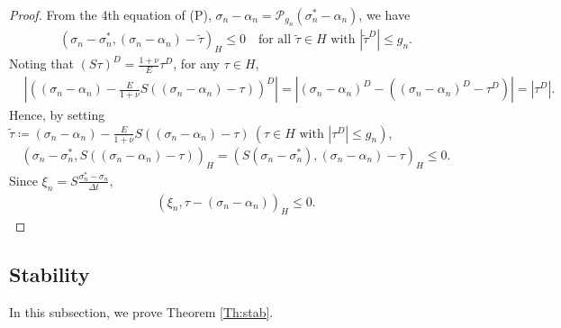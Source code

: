 \documentclass[11pt, a4paper]{article}
\newcommand{\defeq}{\coloneqq}
\newcommand{\dt}{{\Delta t}}
\newcommand{\Hs}{{H}}
\newcommand{\Pop}[1]{\mathcal{P}_{#1}}
\newcommand{\sigmas}[1]{{\sigma_{#1}^*}}
\begin{document}
\begin{proof}
From the 4th equation of (P), $\sigma_n - \alpha_n = \Pop{g_n}(\sigmas{n} - \alpha_n )$, we have 
\begin{align*}
    \left(\sigma_n - \sigmas{n},
    (\sigma_n - \alpha_n) - \tilde{\tau} \right)_\Hs \le 0
    \quad\mbox{for all }\tilde{\tau}\in\Hs\mbox{ with }|\tilde{\tau}^D| \le g_n.
\end{align*}
Noting that $(S\tau)^D = \frac{1+\nu}{E}\tau^D$, for any $\tau\in\Hs$,
\begin{align*}
    &\left|\left((\sigma_n - \alpha_n) - \frac{E}{1+\nu}S\left((\sigma_n - \alpha_n) - \tau\right)\right)^D\right|
    = \left|(\sigma_n - \alpha_n)^D - \left((\sigma_n - \alpha_n)^D - \tau^D\right)\right|
    = |\tau^D|.
\end{align*}
Hence, by setting $\tilde{\tau} \defeq (\sigma_n - \alpha_n) - \frac{E}{1+\nu}S\left((\sigma_n - \alpha_n) - \tau\right)~(\tau\in\Hs\mbox{ with }|\tau^D| \le g_n)$, 
\begin{align*}
    \left(\sigma_n - \sigmas{n},
    S\left((\sigma_n - \alpha_n) - \tau\right) \right)_\Hs
    = \left(S(\sigma_n - \sigmas{n}),
    (\sigma_n - \alpha_n) - \tau \right)_\Hs \le 0.
\end{align*}
Since $\xi_n = S\frac{\sigmas{n}-\sigma_n}{\dt}$,
\begin{align*}
    \left(\xi_n, \tau - (\sigma_n - \alpha_n) \right)_\Hs \le 0.
\end{align*}
\end{proof}

\subsection{Stability}

In this subsection, we prove Theorem \ref{Th:stab}.
\end{document}
